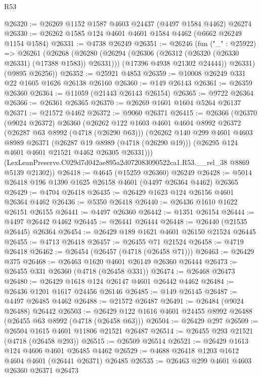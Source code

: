 \begin{lexlean}{R53}
\begin{coremodule}
@26320 := @26269 @1152 @1587 @4603 @24437 (@4497 @1584 @4462) @26274
@26330 := @26262 @1585 @124 @4601 @4601 @1584 @4462 (@6662 @26249 @1154 @1584)
@26331 := @4738 @26249
@26351 := @26246
    (fun ("_" : @25922) =>
    @26261
      (@26268
        (@26280
          (@26294 (@26306 (@26312 (@26320 (@26330 @26331) (@17388 @1583)) @26331)))
          (@17396 @4938 @21302 @24444))
        @26331)
      (@9895 @26256))
@26352 := @25921 @4853
@26359 := @10008 @26249 @331 @22 @1605 @1626 @26138 @26160
@26360 := @149 @26143
@26361 := @26359 @26360
@26364 := @11059 (@21443 @26143 @26154)
@26365 := @9722 @26364
@26366 := @26361 @26365
@26370 := @26269 @1601 @1604 @5264 @26137
@26371 := @21572 @4462
@26372 := @9060 @26371
@26415 := @26366
    (@26370
      (@9024 @26372)
      @26360
      (@26262
        @122
        @1603
        @4601
        @4604
        @8992
        @26372
        (@26287 @63 @8992 (@4718 (@26290 @63)))
        (@26262
          @140
          @299
          @4601
          @4603
          @8989
          @26371
          (@26287 @19 @8989 (@4718 (@26290 @19)))
          (@26295 @124 @4601 @4601 @21521 @4462 @26305 @26331)))
      (LexLeanPreserve.C029d7d042ae895a2d072083090522ca1.R53.__rel_38 @8869 @5139 @21302))
@26418 := @4645 (@15259 @26360) @26249
@26428 := @5014 @26418 @196 @1390 @1625 @26158 @4601 (@4497 @26364 @4462) @26365
@26429 := @4704 @26418
@26435 := @26429 @1623 @124 @26156 @4601 @26364 @4462
@26436 := @5350 @26418
@26440 := @26436 @1610 @1622 @26151 @26155
@26441 := @4497 @26360
@26442 := @1351 @26154
@26444 := @4497 @26442 @4462
@26445 := @26441 @26444
@26448 := @26440 (@21535 @26445) @26364
@26454 := @26429 @189 @1621 @4601 @26150 @21524 @26445
@26455 := @4713 @26418
@26457 := @26455 @71 @21524
@26458 := @4719 @26418
@26462 := @26454 (@26457 (@4718 (@26458 @71)))
@26463 := @26429 @375
@26468 := @26463 @1620 @4601 @26149 @26360 @26444
@26473 := @26455 @331 @26360 (@4718 (@26458 @331))
@26474 := @26468 @26473
@26480 := @26429 @1618 @124 @26147 @4601 @26442 @4462
@26484 := @26436 @1201 @1617 @24456 @26146
@26485 := @149 @26145
@26487 := @4497 @26485 @4462
@26488 := @21572 @26487
@26491 := @26484 (@9024 @26488) @26442
@26503 := @26429 @122 @1616 @4601 @24455 @8992 @26488 (@26455 @63 @8992 (@4718 (@26458 @63)))
@26504 := @26429 @297
@26509 := @26504 @1615 @4601 @11806 @21521 @26487
@26514 := @26455 @293 @21521 (@4718 (@26458 @293))
@26515 := @26509 @26514
@26521 := @26429 @1613 @124 @4606 @4601 @26485 @4462
@26529 := @4688 @26418 @1203 @1612 @4604 @4601 (@26441 @26371) @26485
@26535 := @26463 @299 @4601 @4603 @26360 @26371 @26473

\end{coremodule}
\end{lexlean}
